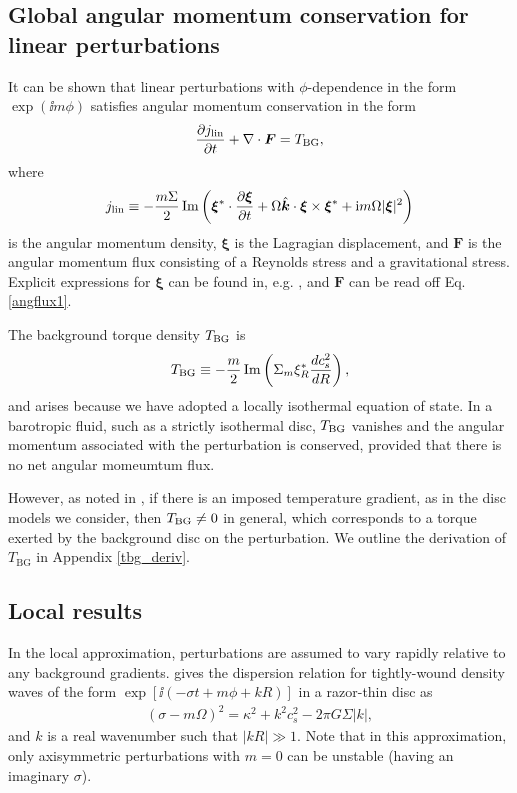 \subsection{Global angular momentum conservation for linear
  perturbations} 
It can be shown that linear perturbations with $\phi$-dependence in the form
$\exp{(\ii m\phi)}$ satisfies angular momentum conservation
in the form 
\begin{align} 
  \frac{\partial j_\mathrm{lin}}{\partial t} + \nabla\cdot\bm{F} = T_\mathrm{BG}, 
\end{align}
\citep[e.g.][]{narayan87,ryu92,lin93} where
\begin{align}\label{lin_ang_mom_cons}
  j_\mathrm{lin} \equiv
  -\frac{m\Sigma}{2}\operatorname{Im}\left(\bm{\xi}^*\cdot\frac{\partial\bm{\xi}}{\partial
      t} + \Omega \hat{\bm{k}}\cdot\bm{\xi}\times\bm{\xi}^* + \mathrm{i}
    m \Omega |\bm{\xi}|^2\right) 
\end{align}
is the angular momentum density, $\bm{\xi}$ is the Lagragian
displacement, and $\bm{F}$ is the angular momentum flux
consisting of a Reynolds stress and a gravitational stress. Explicit
expressions for $\bm{\xi}$ can be found in, e.g. \cite{papaloizou85},
and $\bm{F}$ can be read off Eq. \ref{angflux1}.  


The background torque density $T_\mathrm{BG}$ is 
\begin{align}\label{baroclinic_torque}
  T_\mathrm{BG} \equiv
  -\frac{m}{2}\operatorname{Im}\left(\Sigma_m\xi_R^*\frac{dc_s^2}{dR}\right), 
\end{align}
and arises because we have adopted a locally isothermal equation of
state. In a barotropic fluid, such as a strictly isothermal disc,
$T_\mathrm{BG}$ vanishes and the angular momentum associated with
the perturbation is conserved, provided that there is no net angular
momeumtum flux. 

However, as noted in \cite{lin11}, if there is an imposed
temperature gradient, as in the disc models we consider,
then $T_\mathrm{BG}\neq 0$ in general, which corresponds to a torque
exerted by the background disc on the perturbation. We 
outline the derivation of $T_\mathrm{BG}$ in Appendix 
\ref{tbg_deriv}. 

\subsection{Local results}
In the local approximation, perturbations are assumed to vary rapidly
relative to any background gradients. \cite{shu91} gives the
dispersion relation for tightly-wound density 
waves of the form $\exp{[\ii(-\sigma t + m \phi + kR)]}$ in a razor-thin
disc as  
\begin{align}\label{dispersion}
  (\sigma - m\Omega)^2 = \kappa^2 + k^2c_s^2 - 2\pi G \Sigma |k|, 
\end{align}
and $k$ is a real wavenumber such that $|kR|\gg1$. Note that in this
approximation, only axisymmetric perturbations with $m=0$ can be
unstable (having an imaginary $\sigma$).  

